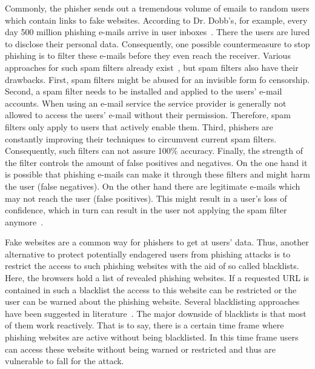 \begin{description}[leftmargin=0cm]
	\item[Spam filters] Commonly, the phisher sends out a tremendous volume of emails to random users which contain links to fake websites.
According to Dr. Dobb's, for example, every day 500 million phishing e-mails arrive in user inboxes~\cite{drdobb2012email}.
 There the users are lured to disclose their personal data.
 Consequently, one possible countermeasure to stop phishing is to filter these e-mails before they even reach the receiver.
 Various approaches for such spam filters already exist~\cite{bergholz2010new,chandrasekaran2006phishing,fette2007learning}, but spam filters also have their drawbacks.
 First, spam filters might be abused for an invisible form fo censorship.
 Second, a spam filter needs to be installed and applied to the users' e-mail accounts.
 When using an e-mail service the service provider is generally not allowed to access the users' e-mail without their permission.
 Therefore, spam filters only apply to users that actively enable them.
 Third, phishers are constantly improving their techniques to circumvent current spam filters.
 Consequently, such filters can not assure 100\% accuracy.
 Finally, the strength of the filter controls the amount of false positives and negatives.
 On the one hand it is possible that phishing e-mails can make it through these filters and might harm the user (false negatives). 
On the other hand there are legitimate e-mails which may not reach the user (false positives). 
This might result in a user's loss of confidence, which in turn can result in the user not applying the spam filter anymore~\cite{olivo2011obtaining}.
	\item[Blacklists] Fake websites are a common way for phishers to get at users' data.
 Thus, another alternative to protect potentially endagered users from phishing attacks is to restrict the access to such phishing websites with the aid of so called blacklists.
 Here, the browsers hold a list of revealed phishing websites.
 If a requested URL is contained in such a blacklist the access to this website can be restricted or the user can be warned about the phishing website.
 Several blacklisting approaches have been suggested in literature~\cite{ma2009beyond, zhang2008highly}. The major downside of blacklists is that most of them work reactively.
 That is to say, there is a certain time frame where phishing websites are active without being blacklisted.
 In this time frame users can access these website without being warned or restricted and thus are vulnerable to fall for the attack.

\end{description}
